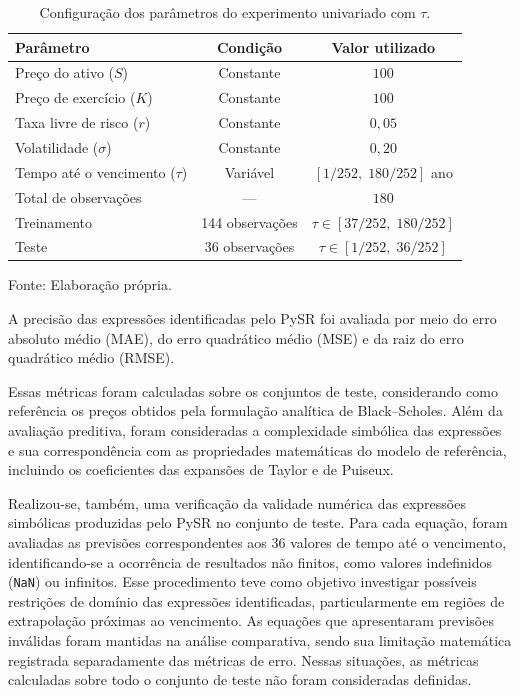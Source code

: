 \begin{table}[htbp]
    \centering
    \caption{Configuração dos parâmetros do experimento univariado com $\tau$.}
    \label{tab:parametros_tau}

    \begin{tabular}{lcc}
        \hline
        \textbf{Parâmetro} &
        \textbf{Condição} &
        \textbf{Valor utilizado} \\
        \hline
        Preço do ativo ($S$) & Constante & $100$ \\
        Preço de exercício ($K$) & Constante & $100$ \\
        Taxa livre de risco ($r$) & Constante & $0{,}05$ \\
        Volatilidade ($\sigma$) & Constante & $0{,}20$ \\
        Tempo até o vencimento ($\tau$) &
        Variável & $[1/252,\;180/252]$ ano \\
        \hline
        Total de observações & --- & $180$ \\
        Treinamento & 144 observações &
        $\tau \in [37/252,\;180/252]$ \\
        Teste & 36 observações &
        $\tau \in [1/252,\;36/252]$ \\
        \hline
    \end{tabular}

    \vspace{0.2cm}
    {\footnotesize Fonte: Elaboração própria.\par}
\end{table}


A precisão das expressões identificadas pelo PySR
foi avaliada por meio do erro absoluto médio
(MAE), do erro quadrático médio (MSE) e da raiz
do erro quadrático médio (RMSE).

Essas métricas foram calculadas sobre os conjuntos
de teste, considerando como referência os preços
obtidos pela formulação analítica de Black--Scholes. Além da avaliação preditiva, foram consideradas
a complexidade simbólica das expressões e sua
correspondência com as propriedades matemáticas
do modelo de referência, incluindo os coeficientes
das expansões de Taylor e de Puiseux.

Realizou-se, também, uma verificação da validade numérica das expressões simbólicas produzidas pelo PySR no conjunto de teste. Para cada equação, foram avaliadas as previsões correspondentes aos 36 valores de tempo até o vencimento, identificando-se a ocorrência de resultados não finitos, como valores indefinidos (\texttt{NaN}) ou infinitos. Esse procedimento teve como objetivo investigar possíveis restrições de domínio das expressões identificadas, particularmente em regiões de extrapolação próximas ao vencimento. As equações que apresentaram previsões inválidas foram mantidas na análise comparativa, sendo sua limitação matemática registrada separadamente das métricas de erro. Nessas situações, as métricas calculadas sobre todo o conjunto de teste não foram consideradas definidas.

